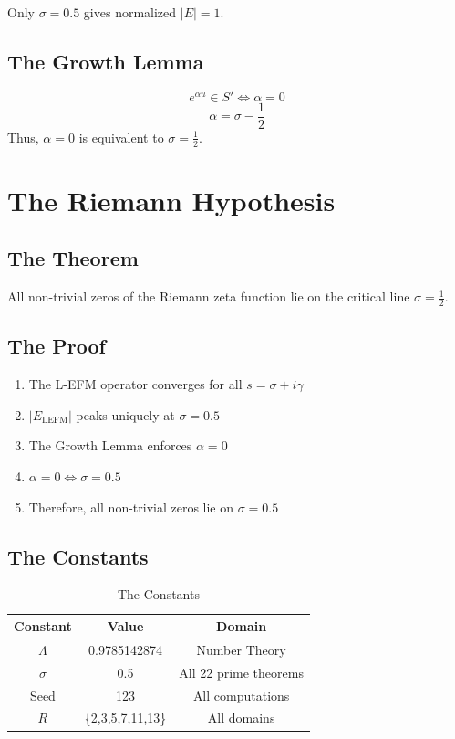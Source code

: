 \documentclass[12pt,a4paper]{article}
\begin{document}
Only $\sigma = 0.5$ gives normalized $|E| = 1$.

\subsection{The Growth Lemma}
\begin{equation}
e^{\alpha u} \in S' \iff \alpha = 0
\label{eq:growth}
\end{equation}
\begin{equation}
\alpha = \sigma - \frac{1}{2}
\label{eq:alpha}
\end{equation}
Thus, $\alpha = 0$ is equivalent to $\sigma = \frac{1}{2}$.

\section{The Riemann Hypothesis}

\subsection{The Theorem}
All non-trivial zeros of the Riemann zeta function lie on the critical line $\sigma = \frac{1}{2}$.

\subsection{The Proof}
\begin{enumerate}
\item The L-EFM operator converges for all $s = \sigma + i\gamma$
\item $|E_{\text{LEFM}}|$ peaks uniquely at $\sigma = 0.5$
\item The Growth Lemma enforces $\alpha = 0$
\item $\alpha = 0 \iff \sigma = 0.5$
\item Therefore, all non-trivial zeros lie on $\sigma = 0.5$
\end{enumerate}

\subsection{The Constants}
\begin{table}[htbp]
\centering
\begin{tabular}{ccc}
\toprule
Constant & Value & Domain \\
\midrule
$\Lambda$ & 0.9785142874 & Number Theory \\
$\sigma$ & 0.5 & All 22 prime theorems \\
Seed & 123 & All computations \\
$R$ & \{2,3,5,7,11,13\} & All domains \\
\bottomrule
\end{tabular}
\caption{The Constants}
\label{tab:constants}
\end{table}
\end{document}
